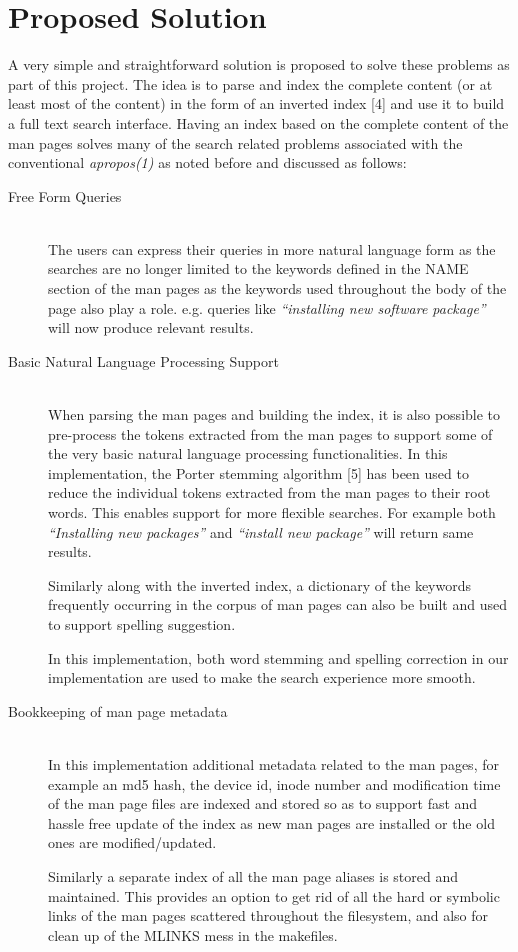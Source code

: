 \documentclass[titlepage, a4paper, 12pt]{article}
\begin{document}
\section{Proposed Solution}
A very simple and straightforward solution is proposed to solve these problems as
part of this project.
The idea is to parse and index
the complete content (or at least most of the content) in the form of an
inverted index [4] and use it to build a full text search
interface. Having an index based on the complete content of the man pages solves
many of the search
related problems associated with the conventional \textit{apropos(1)} as noted
before and discussed as follows:
\begin{description}
\item[Free Form Queries] \hfill \\
The users can express their queries in more natural language form as the searches
are no longer limited to the keywords defined in the NAME section of the man
pages as the keywords used throughout the body of the page also play a role.
e.g. queries like \textit{``installing new software package''}
will now produce relevant results.
\end{description}
\begin{description}
\item[Basic Natural Language Processing Support] \hfill \\
When parsing the man pages and building the index, it is also possible to
pre-process the tokens extracted from the man pages to support some of the very
basic natural language processing functionalities. In this implementation, the
Porter stemming algorithm [5] has been used to
reduce the individual tokens extracted from the man pages to their root words.
This enables support for more flexible searches. For example both
\textit{``Installing new packages''} and \textit{``install new package''} will
return same results.

Similarly along with the inverted index, a dictionary of the keywords frequently
occurring in the corpus of man pages can also be built and used to support
spelling suggestion.

In this implementation, both word stemming and spelling correction in our implementation are used to make the search experience more smooth.
\end{description}
\begin{description}
\item[Bookkeeping of man page metadata] \hfill \\
In this implementation additional metadata related to the man pages, for example
an md5 hash, the device id, inode number and modification time
of the man page files are indexed and stored so
as to support fast and hassle free update of the index as new man pages are
installed or the old ones are modified/updated.

Similarly a separate index of all the man page aliases is stored and maintained.
This provides an option to get rid of all the hard or symbolic links of the man
pages scattered throughout the filesystem, and also for clean up of the MLINKS
mess in the makefiles.
\end{description}
\end{document}
